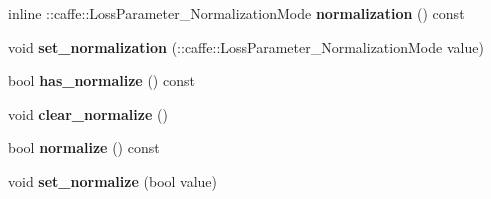 \begin{DoxyCompactItemize}
inline \+::caffe\+::\+Loss\+Parameter\+\_\+\+Normalization\+Mode {\bfseries normalization} () const
\item 
\mbox{\label{classcaffe_1_1_loss_parameter_aa6943f13929b8fab839f040fca955ed0}} 
void {\bfseries set\+\_\+normalization} (\+::caffe\+::\+Loss\+Parameter\+\_\+\+Normalization\+Mode value)
\item 
\mbox{\label{classcaffe_1_1_loss_parameter_afa5657c1d69e053530abb6630aaa4cf7}} 
bool {\bfseries has\+\_\+normalize} () const
\item 
\mbox{\label{classcaffe_1_1_loss_parameter_a4c309b04458b8bbdd458933ef6cfd6a7}} 
void {\bfseries clear\+\_\+normalize} ()
\item 
\mbox{\label{classcaffe_1_1_loss_parameter_a70a0c209127e6f4b6de4a89b26a41bfc}} 
bool {\bfseries normalize} () const
\item 
\mbox{\label{classcaffe_1_1_loss_parameter_ab0af3efeaf1b62ab68548ad06f313b83}} 
void {\bfseries set\+\_\+normalize} (bool value)
\end{DoxyCompactItemize}

